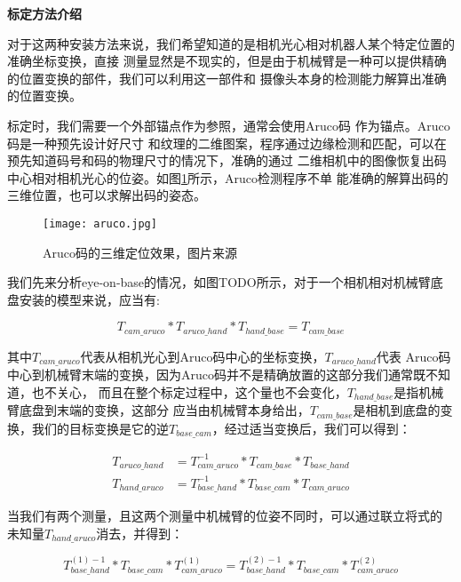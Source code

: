 \noindent \textbf{标定方法介绍}

对于这两种安装方法来说，我们希望知道的是相机光心相对机器人某个特定位置的准确坐标变换，直接
测量显然是不现实的，但是由于机械臂是一种可以提供精确的位置变换的部件，我们可以利用这一部件和
摄像头本身的检测能力解算出准确的位置变换。

标定时，我们需要一个外部锚点作为参照，通常会使用Aruco码\cite{garrido2014automatic}
作为锚点。Aruco码是一种预先设计好尺寸
和纹理的二维图案，程序通过边缘检测和匹配，可以在预先知道码号和码的物理尺寸的情况下，准确的通过
二维相机中的图像恢复出码中心相对相机光心的位姿。如图\ref{fig:aruco}所示，Aruco检测程序不单
能准确的解算出码的三维位置，也可以求解出码的姿态。

\begin{figure}[h] %
  \centering
  \texttt{[image: aruco.jpg]}
  \caption{Aruco码的三维定位效果，图片来源\cite{aruco}}
  \label{fig:aruco}
\end{figure}

我们先来分析eye-on-base的情况，如图TODO所示，对于一个相机相对机械臂底盘安装的模型来说，应当有:

\begin{equation}
  T_{cam\_aruco} * T_{aruco\_hand} * T_{hand\_base} = T_{cam\_base}
\end{equation}

其中$T_{cam\_aruco}$代表从相机光心到Aruco码中心的坐标变换，$T_{aruco\_hand}$代表
Aruco码中心到机械臂末端的变换，因为Aruco码并不是精确放置的这部分我们通常既不知道，也不关心，
而且在整个标定过程中，这个量也不会变化，$T_{hand\_base}$是指机械臂底盘到末端的变换，这部分
应当由机械臂本身给出，$T_{cam\_base}$是相机到底盘的变换，我们的目标变换是它的逆$T_{base\_cam}$，经过适当变换后，我们可以得到：

\begin{equation}
  \begin{aligned}
    T_{aruco\_hand} &= T_{cam\_aruco}^{-1} * T_{cam\_base} * T_{base\_hand} \\
    T_{hand\_aruco} &= T_{base\_hand}^{-1} * T_{base\_cam} * T_{cam\_aruco}
  \end{aligned}
\end{equation}

当我们有两个测量，且这两个测量中机械臂的位姿不同时，可以通过联立将式的
未知量$T_{hand\_aruco}$消去，并得到：

\begin{equation}
  T_{base\_hand}^{(1)-1} * T_{base\_cam} * T_{cam\_aruco}^{(1)} = 
  T_{base\_hand}^{(2)-1} * T_{base\_cam} * T_{cam\_aruco}^{(2)}
\end{equation}

